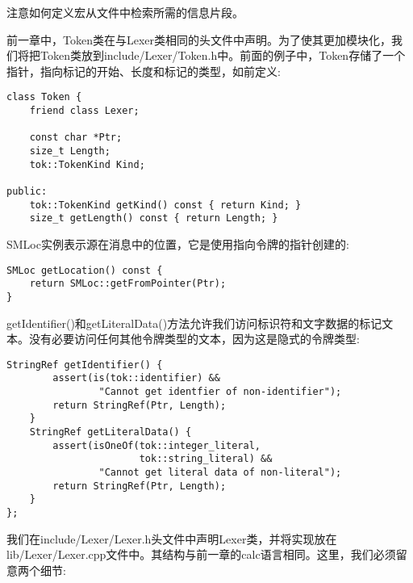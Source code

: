 \begin{tcolorbox}[colback=blue!5!white,colframe=blue!75!black,title=Tip]
注意如何定义宏从文件中检索所需的信息片段。
\end{tcolorbox}

前一章中，Token类在与Lexer类相同的头文件中声明。为了使其更加模块化，我们将把Token类放到include/Lexer/Token.h中。前面的例子中，Token存储了一个指针，指向标记的开始、长度和标记的类型，如前定义:\par

\begin{lstlisting}[caption={}]
class Token {
	friend class Lexer;
	
	const char *Ptr;
	size_t Length;
	tok::TokenKind Kind;
	
public:
	tok::TokenKind getKind() const { return Kind; }
	size_t getLength() const { return Length; }
\end{lstlisting}

SMLoc实例表示源在消息中的位置，它是使用指向令牌的指针创建的:\par

\begin{lstlisting}[caption={}]
SMLoc getLocation() const {
	return SMLoc::getFromPointer(Ptr);
}
\end{lstlisting}

getIdentifier()和getLiteralData()方法允许我们访问标识符和文字数据的标记文本。没有必要访问任何其他令牌类型的文本，因为这是隐式的令牌类型:\par

\begin{lstlisting}[caption={}]
	StringRef getIdentifier() {
		assert(is(tok::identifier) &&
				"Cannot get identfier of non-identifier");
		return StringRef(Ptr, Length);
	}
	StringRef getLiteralData() {
		assert(isOneOf(tok::integer_literal,
					   tok::string_literal) &&
				"Cannot get literal data of non-literal");
		return StringRef(Ptr, Length);
	}
};
\end{lstlisting}

我们在include/Lexer/Lexer.h头文件中声明Lexer类，并将实现放在lib/Lexer/Lexer.cpp文件中。其结构与前一章的calc语言相同。这里，我们必须留意两个细节:\par

